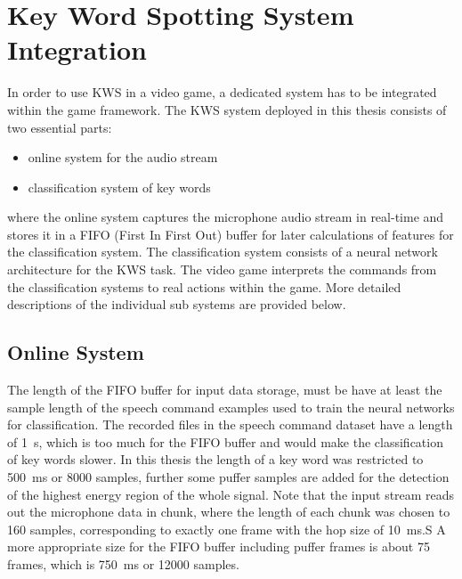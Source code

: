 
\section{Key Word Spotting System Integration}
\thesisStateNotReady
In order to use KWS in a video game, a dedicated system has to be integrated within the game framework.
The KWS system deployed in this thesis consists of two essential parts:
\begin{itemize}
	\item online system for the audio stream
	\item classification system of key words
\end{itemize}
where the online system captures the microphone audio stream in real-time and stores it in a FIFO (First In First Out) buffer for later calculations of features for the classification system.
The classification system consists of a neural network architecture for the KWS task.
The video game interprets the commands from the classification systems to real actions within the game.
More detailed descriptions of the individual sub systems are provided below.



\subsection{Online System}
The length of the FIFO buffer for input data storage, must be have at least the sample length of the speech command examples used to train the neural networks for classification.
The recorded files in the speech command dataset have a length of \SI{1}{\second}, which is too much for the FIFO buffer and would make the classification of key words slower.
In this thesis the length of a key word was restricted to \SI{500}{\milli\second} or 8000 samples, further some puffer samples are added for the detection of the highest energy region of the whole signal.
Note that the input stream reads out the microphone data in chunk, where the length of each chunk was chosen to 160 samples, corresponding to exactly one frame with the hop size of \SI{10}{\milli\second}.S
A more appropriate size for the FIFO buffer including puffer frames is about 75 frames, which is \SI{750}{\milli\second} or 12000 samples.

